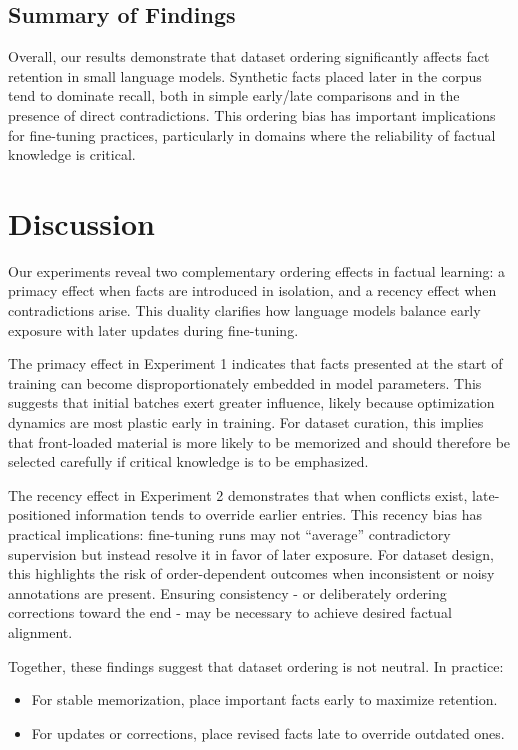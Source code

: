\documentclass[11pt]{article}
\begin{document}
    \subsection{Summary of Findings}
    Overall, our results demonstrate that dataset ordering significantly affects fact retention in small language models. Synthetic facts placed later in the corpus tend to dominate recall, both in simple early/late comparisons and in the presence of direct contradictions. This ordering bias has important implications for fine-tuning practices, particularly in domains where the reliability of factual knowledge is critical.

    \section{Discussion}
    Our experiments reveal two complementary ordering effects in factual learning: a primacy effect when facts are introduced in isolation, and a recency effect when contradictions arise. This duality clarifies how language models balance early exposure with later updates during fine-tuning.

    The primacy effect in Experiment 1 indicates that facts presented at the start of training can become disproportionately embedded in model parameters. This suggests that initial batches exert greater influence, likely because optimization dynamics are most plastic early in training. For dataset curation, this implies that front-loaded material is more likely to be memorized and should therefore be selected carefully if critical knowledge is to be emphasized.

    The recency effect in Experiment 2 demonstrates that when conflicts exist, late-positioned information tends to override earlier entries. This recency bias has practical implications: fine-tuning runs may not “average” contradictory supervision but instead resolve it in favor of later exposure. For dataset design, this highlights the risk of order-dependent outcomes when inconsistent or noisy annotations are present. Ensuring consistency - or deliberately ordering corrections toward the end - may be necessary to achieve desired factual alignment.

    Together, these findings suggest that dataset ordering is not neutral. In practice:

    \begin{itemize}
        \item For stable memorization, place important facts early to maximize retention.
        \item For updates or corrections, place revised facts late to override outdated ones.
    \end{itemize}
\end{document}
